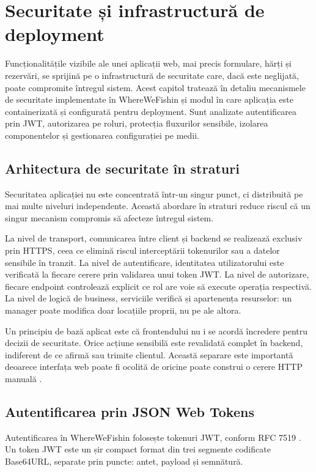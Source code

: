﻿\chapter{Securitate și infrastructură de deployment}

Funcționalitățile vizibile ale unei aplicații web, mai precis formulare, hărți și rezervări, se sprijină pe o infrastructură de securitate care, dacă este neglijată, poate compromite întregul sistem. Acest capitol tratează în detaliu mecanismele de securitate implementate în WhereWeFishin și modul în care aplicația este containerizată și configurată pentru deployment. Sunt analizate autentificarea prin JWT, autorizarea pe roluri, protecția fluxurilor sensibile, izolarea componentelor și gestionarea configurației pe medii.

\section{Arhitectura de securitate în straturi}

Securitatea aplicației nu este concentrată într-un singur punct, ci distribuită pe mai multe niveluri independente. Această abordare în straturi reduce riscul că un singur mecanism compromis să afecteze întregul sistem.

La nivel de transport, comunicarea între client și backend se realizează exclusiv prin HTTPS, ceea ce elimină riscul interceptării tokenurilor sau a datelor sensibile în tranzit. La nivel de autentificare, identitatea utilizatorului este verificată la fiecare cerere prin validarea unui token JWT. La nivel de autorizare, fiecare endpoint controlează explicit ce rol are voie să execute operația respectivă. La nivel de logică de business, serviciile verifică și apartenența resurselor: un manager poate modifica doar locațiile proprii, nu pe ale altora.

Un principiu de bază aplicat este că frontendului nu i se acordă încredere pentru decizii de securitate. Orice acțiune sensibilă este revalidată complet în backend, indiferent de ce afirmă sau trimite clientul. Această separare este importantă deoarece interfața web poate fi ocolită de oricine poate construi o cerere HTTP manuală \citep{owasp}.

\section{Autentificarea prin JSON Web Tokens}

Autentificarea în WhereWeFishin folosește tokenuri JWT, conform RFC 7519 \citep{jwt}. Un token JWT este un șir compact format din trei segmente codificate Base64URL, separate prin puncte: antet, payload și semnătură.

